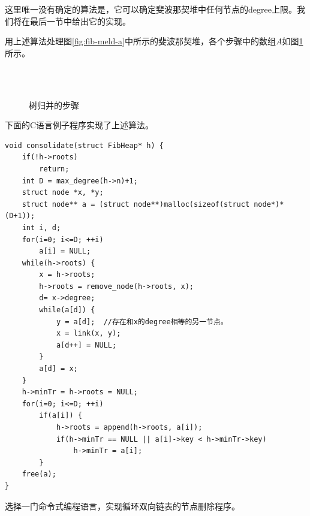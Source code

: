 \documentclass[b5paper]{ctexart}
\begin{document}
这里唯一没有确定的算法是，它可以确定斐波那契堆中任何节点的degree上限。我们将在最后一节中给出它的实现。

用上述算法处理图\ref{fig:fib-meld-a}中所示的斐波那契堆，各个步骤中的数组$A$如图\ref{fig:fib-cons-c}所示。

\captionsetup[subfigure]{labelformat=empty, margin=10pt}
\begin{figure}[htbp]
  \centering
   \\
   \\
  \caption{树归并的步骤} \label{fig:fib-cons-c}
\end{figure}
\captionsetup[subfigure]{labelformat=parens}

下面的C语言例子程序实现了上述算法。

\lstset{language=C}
\begin{lstlisting}
void consolidate(struct FibHeap* h) {
    if(!h->roots)
        return;
    int D = max_degree(h->n)+1;
    struct node *x, *y;
    struct node** a = (struct node**)malloc(sizeof(struct node*)*(D+1));
    int i, d;
    for(i=0; i<=D; ++i)
        a[i] = NULL;
    while(h->roots) {
        x = h->roots;
        h->roots = remove_node(h->roots, x);
        d= x->degree;
        while(a[d]) {
            y = a[d];  //存在和x的degree相等的另一节点。
            x = link(x, y);
            a[d++] = NULL;
        }
        a[d] = x;
    }
    h->minTr = h->roots = NULL;
    for(i=0; i<=D; ++i)
        if(a[i]) {
            h->roots = append(h->roots, a[i]);
            if(h->minTr == NULL || a[i]->key < h->minTr->key)
                h->minTr = a[i];
        }
    free(a);
}
\end{lstlisting}

\begin{Exercise}
选择一门命令式编程语言，实现循环双向链表的节点删除程序。
\end{Exercise}
\end{document}
